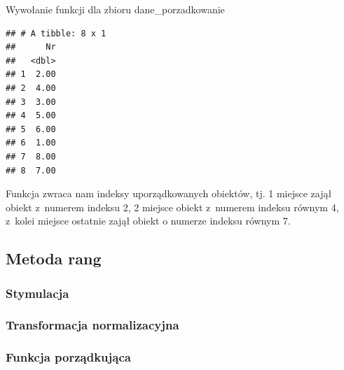 \documentclass[12pt,a4paper]{report}
\begin{document}
{Wywołanie funkcji dla zbioru dane\_porzadkowanie 

\begin{Shaded}
\begin{Highlighting}[]
\end{Highlighting}
\end{Shaded}

\begin{verbatim}
## # A tibble: 8 x 1
##      Nr
##   <dbl>
## 1  2.00
## 2  4.00
## 3  3.00
## 4  5.00
## 5  6.00
## 6  1.00
## 7  8.00
## 8  7.00
\end{verbatim}

Funkcja zwraca nam indeksy uporządkowanych obiektów, tj. 1 miejsce
zajął obiekt z~numerem indeksu 2, 2 miejsce obiekt z~numerem indeksu
równym 4, z~kolei miejsce ostatnie zajął obiekt o numerze indeksu równym
7.

\subsection{Metoda rang}
\subsubsection{Stymulacja} 
\begin{Shaded}
\begin{Highlighting}[]
\NormalTok{)} 
\end{Highlighting}
\end{Shaded}


\subsubsection{Transformacja normalizacyjna}
\begin{Shaded}
\begin{Highlighting}[]
\end{Highlighting}
\end{Shaded}

\subsubsection{Funkcja porządkująca}\label{funkcja-porzadkujaca-metoda-rang}

}
\end{document}
